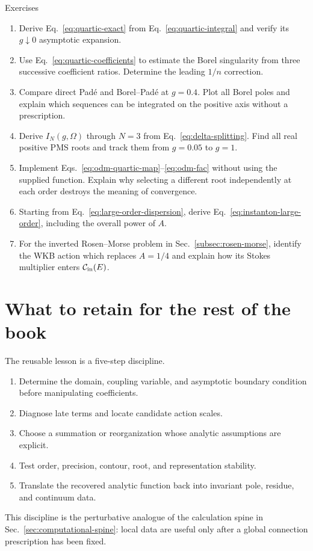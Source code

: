 \begin{derivationbox}{Exercises}
\begin{enumerate}[label=\textbf{R.\arabic*}]
  \item Derive Eq.~\eqref{eq:quartic-exact} from
        Eq.~\eqref{eq:quartic-integral} and verify its $g\downarrow0$
        asymptotic expansion.
  \item Use Eq.~\eqref{eq:quartic-coefficients} to estimate the Borel
        singularity from three successive coefficient ratios.  Determine the
        leading $1/n$ correction.
  \item Compare direct Pad\'e and Borel--Pad\'e at $g=0.4$.  Plot all Borel
        poles and explain which sequences can be integrated on the positive
        axis without a prescription.
  \item Derive $I_N(g,\Omega)$ through $N=3$ from
        Eq.~\eqref{eq:delta-splitting}.  Find all real positive PMS roots and
        track them from $g=0.05$ to $g=1$.
  \item Implement Eqs.~\eqref{eq:odm-quartic-map}--\eqref{eq:odm-fac} without
        using the supplied function.  Explain why selecting a different root
        independently at each order destroys the meaning of convergence.
  \item Starting from Eq.~\eqref{eq:large-order-dispersion}, derive
        Eq.~\eqref{eq:instanton-large-order}, including the overall power of
        $A$.
  \item For the inverted Rosen--Morse problem in
        Sec.~\ref{subsec:rosen-morse}, identify the WKB action which replaces
        $A=1/4$ and explain how its Stokes multiplier enters
        $\mathcal{C}_{\mathrm{in}}(E)$.
\end{enumerate}
\end{derivationbox}

\section{What to retain for the rest of the book}
\label{sec:resummation-retain}

The reusable lesson is a five-step discipline.
\begin{enumerate}[label=\arabic*.]
  \item Determine the domain, coupling variable, and asymptotic boundary
        condition before manipulating coefficients.
  \item Diagnose late terms and locate candidate action scales.
  \item Choose a summation or reorganization whose analytic assumptions are
        explicit.
  \item Test order, precision, contour, root, and representation stability.
  \item Translate the recovered analytic function back into invariant pole,
        residue, and continuum data.
\end{enumerate}
This discipline is the perturbative analogue of the calculation spine in
Sec.~\ref{sec:computational-spine}: local data are useful only after a global
connection prescription has been fixed.
